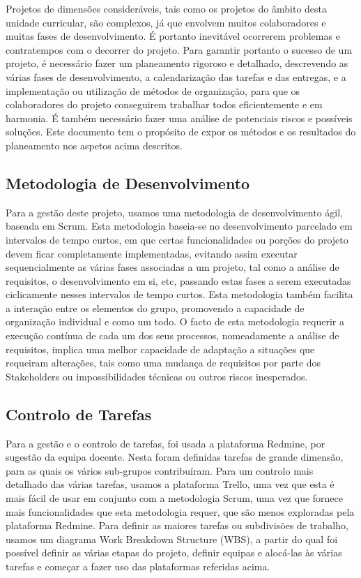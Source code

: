 Projetos de dimensões consideráveis, tais como os projetos do âmbito desta unidade curricular, são complexos, já que envolvem muitos colaboradores e muitas fases de desenvolvimento. É portanto inevitável ocorrerem problemas e contratempos com o decorrer do projeto.
Para garantir portanto o sucesso de um projeto, é necessário fazer um planeamento rigoroso e detalhado, descrevendo as várias fases de desenvolvimento, a calendarização das tarefas e das entregas, e a implementação ou utilização de métodos de organização, para que os colaboradores do projeto conseguirem trabalhar todos eficientemente e em harmonia. É também necessário fazer uma análise de potenciais riscos e possíveis soluções.
Este documento tem o propósito de expor os métodos e os resultados do planeamento nos aspetos acima descritos.

\subsection*{Metodologia de Desenvolvimento}
Para a gestão deste projeto, usamos uma metodologia de desenvolvimento ágil, baseada em Scrum. Esta metodologia baseia-se no desenvolvimento parcelado em intervalos de tempo curtos, em que certas funcionalidades ou porções do projeto devem ficar completamente implementadas, evitando assim executar sequencialmente as várias fases associadas a um projeto, tal como a análise de requisitos, o desenvolvimento em si, etc, passando estas fases a serem executadas ciclicamente nesses intervalos de tempo curtos. Esta metodologia também facilita a interação entre os elementos do grupo, promovendo a capacidade de organização individual e como um todo.
O facto de esta metodologia requerir a execução contínua de cada um dos seus processos, nomeadamente a análise de requisitos, implica uma melhor capacidade de adaptação a situações que requeiram alterações, tais como uma mudança de requisitos por parte dos Stakeholders ou impossibilidades técnicas ou outros riscos inesperados.

\subsection*{Controlo de Tarefas}
Para a gestão e o controlo de tarefas, foi usada a plataforma Redmine, por sugestão da equipa docente. Nesta foram definidas tarefas de grande dimensão, para as quais os vários sub-grupos contribuíram. Para um controlo mais detalhado das várias tarefas, usamos a plataforma Trello, uma vez que esta é mais fácil de usar em conjunto com a metodologia Scrum, uma vez que fornece mais funcionalidades que esta metodologia requer, que são menos exploradas pela plataforma Redmine.
Para definir as maiores tarefas ou subdivisões de trabalho, usamos um diagrama Work Breakdown Structure (WBS), a partir do qual foi possível definir as várias etapas do projeto, definir equipas e alocá-las às várias tarefas e começar a fazer uso das plataformas referidas acima.

